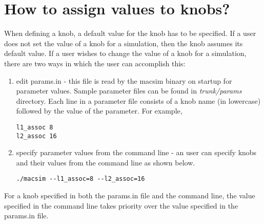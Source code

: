 


\section{How to assign values to knobs?}

When defining a knob, a default value for the knob has to be specified. If a
user does not set the value of a knob for a simulation, then the knob assumes
its default value. If a user wishes to change the value of a knob for a
simulation, there are two ways in which the user can accomplish this:



\begin{enumerate}

  \item edit params.in - this file is read by the macsim binary on startup for
parameter values.  Sample parameter files can be found in \textit{trunk/params}
directory. Each line in a parameter file consists of a knob name (in
lowercase) followed by the value of the parameter.  For example,

\begin{Verbatim}
l1_assoc 8
l2_assoc 16
\end{Verbatim}


  \item specify parameter values from the command line - an user can specify
  knobs and their values from the command line as shown below.

\begin{Verbatim}
./macsim --l1_assoc=8 --l2_assoc=16
\end{Verbatim}

\end{enumerate}

For a knob specified in both the params.in file and the command line, the value
specified in the command line takes priority over the value specified in the
params.in file.



